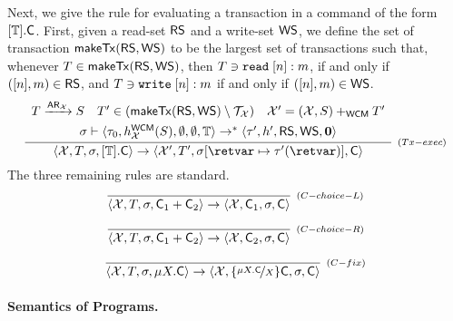 \documentclass[a4paper,UKenglish]{article}%
\theoremstyle{plain}
\begin{document}
Next, we give the rule for evaluating a transaction in a command of the form $[\mathbb{T}].\mathsf{C}$. 
First, given a read-set $\mathsf{RS}$ and a write-set $\mathsf{WS}$, we define the set of transaction $\mathsf{makeTx}(\mathsf{RS},\mathsf{WS})$ 
to be the largest set of transactions such that, whenever $T \in \mathsf{makeTx}(\mathsf{RS}, \mathsf{WS})$, then $T \ni {{\tt read}}\;[n]:m$, if and only if $([n], m) \in \mathsf{RS}$, and $T \ni 
{{\tt write}}\;[n]:m$ if and only if $([n], m) \in \mathsf{WS}$. 
\[
\infer[{\scriptstyle{(Tx-exec)}}]{\langle \aexec, T, \thdstack, \TxOp{\trans}.\Cmd \rangle \rightarrow 
\langle \aexec', T', \thdstack[\retvar \mapsto \txstack'(\retvar)], \Cmd \rangle}
{
\begin{array}{lll}T \xrightarrow{\AR_{\aexec}} S &  T' \in (\makeTx(\RS,\WS) \setminus \T_{\aexec}) & \aexec' = (\aexec, S) \aeplus_{\xspec} T'\\[4pt]
\multicolumn{3}{c}{\thdstack \vdash \langle \txstack_0, \heap_{\aexec}^{\xspec}(S), \emptyset, \emptyset, \trans \rangle \rightarrow^\ast \langle \txstack', \heap', \RS, \WS, \nil \rangle}
\end{array}}
\]
The three remaining rules are standard.
\[
\infer[{\scriptstyle{(C-choice-L)}}]
{\langle \aexec, T, \thdstack, \Cmd_1 + \Cmd_2 \rangle \rightarrow \langle \aexec, \Cmd_1, \thdstack, \Cmd \rangle}
{} 
\]

\[
\infer[{\scriptstyle{(C-choice-R)}}]
{\langle \aexec, T, \thdstack, \Cmd_1 + \Cmd_2 \rangle \rightarrow \langle \aexec, \Cmd_2, \thdstack, \Cmd \rangle}
{} 
\]

\[
\infer[{\scriptstyle{(C-fix)}}]
{\langle \aexec, T, \thdstack, \mu X.\Cmd \rangle \rightarrow \langle \aexec, \{\nicefrac{\mu X.\Cmd}{X}\}\Cmd, \thdstack, \Cmd \rangle}
{} 
\]

\paragraph{\textbf{Semantics of Programs.}}



\end{document}
